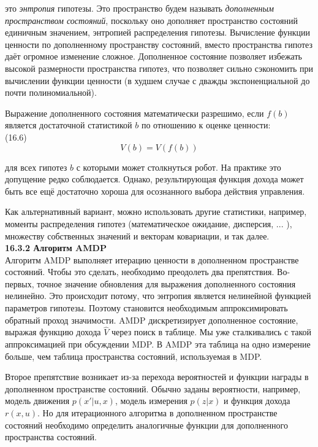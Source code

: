 \documentclass[10pt,a4paper]{article}
\begin{document}
это \textit{энтропия} гипотезы. Это пространство будем называть \textit{дополненным пространством состояний},
поскольку оно дополняет пространство состояний единичным значением, энтропией распределения гипотезы. Вычисление функции ценности по дополненному пространству состояний, вместо пространства гипотез даёт огромное изменение сложное. Дополненное состояние позволяет избежать высокой размерности пространства гипотез, что позволяет сильно сэкономить при вычислении функции ценности (в худшем случае с дважды экспоненциальной до почти полиномиальной).

Выражение дополненного состояния математически разрешимо, если $f(b)$ является достаточной статистикой $b$ по отношению к оценке ценности:\\

(16.6)
$$V(b)=V(f(b))$$

для всех гипотез $b$ с которыми может столкнуться робот. На практике это допущение редко соблюдается. Однако, результирующая функция дохода может быть все ещё достаточно хороша для осознанного выбора действия управления.

Как альтернативный вариант, можно использовать другие статистики, например, моменты распределения гипотез (математическое ожидание, дисперсия, ... ), множеству собственных значений и векторам ковариации, и так далее.\\

\textbf{16.3.2	Алгоритм AMDP }\\

Алгоритм AMDP выполняет итерацию ценности в дополненном пространстве состояний. Чтобы это сделать, необходимо преодолеть два препятствия. Во-первых, точное значение обновления для выражения дополненного состояния нелинейно. Это происходит потому, что энтропия является нелинейной функцией параметров гипотезы. Поэтому становится необходимым аппроксимировать обратный проход значимости. AMDP дискретизирует дополненное состояние, выражая функцию дохода $\hat{V}$  через поиск в таблице. Мы уже сталкивались с такой аппроксимацией при обсуждении MDP. В AMDP эта таблица на одно измерение больше, чем таблица пространства состояний, используемая в MDP.

Второе препятствие возникает из-за перехода вероятностей и функции награды в дополненном пространстве состояний. Обычно заданы вероятности, например, модель движения $p(x' | u, x)$, модель измерения $p(z | x)$ и функция дохода $r(x, u)$. Но для итерационного алгоритма в дополненном пространстве состояний необходимо определить аналогичные функции для дополненного пространства состояний.
\end{document}
